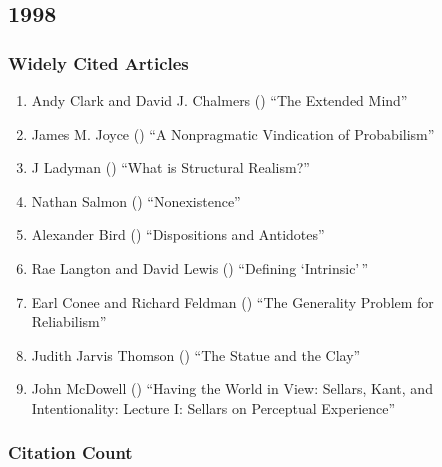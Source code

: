 \documentclass[
  10pt,
  letterpaper,
  DIV=11,
  numbers=noendperiod,
  twoside]{scrartcl}
\providecommand{\tightlist}{%
  \setlength{\itemsep}{0pt}\setlength{\parskip}{0pt}}\usepackage{longtable,booktabs,array}
\begin{document}
\newpage

\subsection{1998}\label{sec-s1998}

\subsubsection*{Widely Cited Articles}\label{widely-cited-articles-41}

\begin{enumerate}
\def\labelenumi{\arabic{enumi}.}
\tightlist
\item
  Andy Clark and David J. Chalmers
  () ``The Extended Mind''
\item
  James M. Joyce () ``A
  Nonpragmatic Vindication of Probabilism''
\item
  J Ladyman () ``What is
  Structural Realism?''
\item
  Nathan Salmon ()
  ``Nonexistence''
\item
  Alexander Bird ()
  ``Dispositions and Antidotes''
\item
  Rae Langton and David Lewis ()
  ``Defining `Intrinsic'\,''
\item
  Earl Conee and Richard Feldman
  () ``The Generality Problem for
  Reliabilism''
\item
  Judith Jarvis Thomson () ``The
  Statue and the Clay''
\item
  John McDowell () ``Having the
  World in View: Sellars, Kant, and Intentionality: Lecture I: Sellars
  on Perceptual Experience''
\end{enumerate}

\subsubsection*{Citation Count}\label{sec-count-1998}
\end{document}
